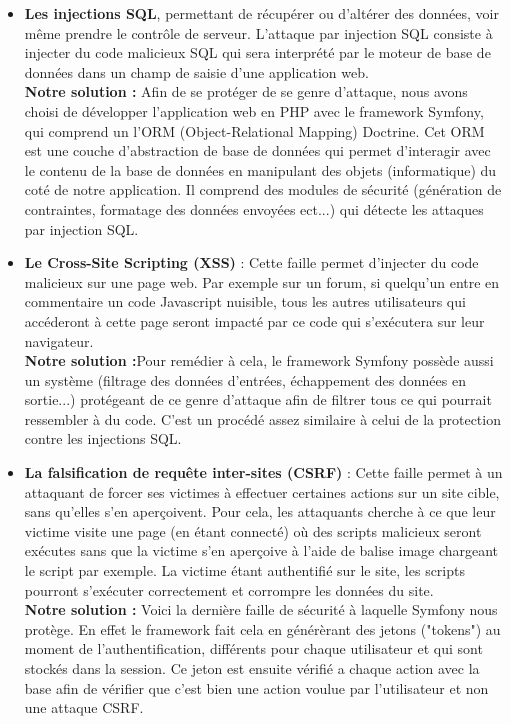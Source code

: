 \documentclass[12pt,a4paper]{article}
\begin{document}
\begin{itemize}
    \item \textbf{Les injections SQL}, permettant de récupérer ou d'altérer des données, voir même prendre le contrôle de serveur. L'attaque par injection SQL consiste à injecter du code malicieux SQL qui sera interprété par le moteur de base de données dans un champ de saisie d'une application web. \\
    \textbf{Notre solution :} Afin de se protéger de se genre d'attaque, nous avons choisi de développer l'application web en PHP avec le framework Symfony, qui comprend un l'ORM (Object-Relational Mapping) Doctrine. Cet ORM est une couche d'abstraction de base de données qui permet d'interagir avec le contenu de la base de données en manipulant des objets (informatique) du coté de notre application. Il comprend des modules de sécurité (génération de contraintes, formatage des données envoyées ect...) qui détecte les attaques par injection SQL.
    
    \item \textbf{Le Cross-Site Scripting (XSS)} : Cette faille permet d'injecter du code malicieux sur une page web. Par exemple sur un forum, si quelqu'un entre en commentaire un code Javascript nuisible, tous les autres utilisateurs qui accéderont à cette page seront impacté par ce code qui s'exécutera sur leur navigateur. \\
    \textbf{Notre solution :}Pour remédier à cela, le framework Symfony possède aussi un système (filtrage des données d'entrées, échappement des données en sortie...) protégeant de ce genre d'attaque afin de filtrer tous ce qui pourrait ressembler à du code. C'est un procédé assez similaire à celui de la protection contre les injections SQL.
    
    \item \textbf{La falsification de requête inter-sites (CSRF)} : Cette faille permet à un attaquant de forcer ses victimes à effectuer certaines actions sur un site cible, sans qu'elles s'en aperçoivent. Pour cela, les attaquants cherche à ce que leur victime visite une page (en étant connecté) où des scripts malicieux seront exécutes sans que la victime s'en aperçoive à l'aide de balise image chargeant le script par exemple. La victime étant authentifié sur le site, les scripts pourront s'exécuter correctement et corrompre les données du site. \\
    \textbf{Notre solution :} Voici la dernière faille de sécurité à laquelle Symfony nous protège. En effet le framework fait cela en générèrant des jetons ("tokens") au moment de l'authentification, différents pour chaque utilisateur et qui sont stockés dans la session. Ce jeton est ensuite vérifié a chaque action avec la base afin de vérifier que c'est bien une action voulue par l'utilisateur et non une attaque CSRF. 
    

\end{itemize}
\end{document}
